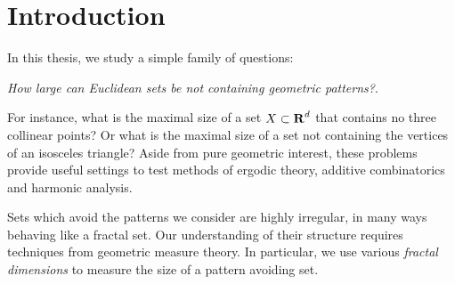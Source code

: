 
\chapter{Introduction}
\label{ch:Introduction}

In this thesis, we study a simple family of questions:
%
\begin{center}
	{\it How large can Euclidean sets be not containing geometric patterns?}.
\end{center}
%
For instance, what is the maximal size of a set $X \subset \operatorname{\mathbf{R}}^d$ that contains no three collinear points? Or what is the maximal size of a set not containing the vertices of an isosceles triangle? Aside from pure geometric interest, these problems provide useful settings to test methods of ergodic theory, additive combinatorics and harmonic analysis.

Sets which avoid the patterns we consider are highly irregular, in many ways behaving like a fractal set. Our understanding of their structure requires techniques from geometric measure theory. In particular, we use various \emph{fractal dimensions} to measure the size of a pattern avoiding set.




